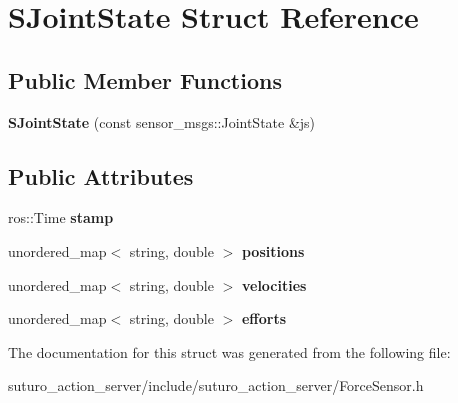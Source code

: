 \hypertarget{structSJointState}{\section{S\-Joint\-State Struct Reference}
\label{structSJointState}
}
\subsection*{Public Member Functions}
\begin{DoxyCompactItemize}
\item 
\hypertarget{structSJointState_a8f07fd4b8cb528fd52ab266fd4420513}{{\bfseries S\-Joint\-State} (const sensor\-\_\-msgs\-::\-Joint\-State \&js)}\label{structSJointState_a8f07fd4b8cb528fd52ab266fd4420513}

\end{DoxyCompactItemize}
\subsection*{Public Attributes}
\begin{DoxyCompactItemize}
\item 
\hypertarget{structSJointState_a0bd061234683d61e344f7d30fd6347bc}{ros\-::\-Time {\bfseries stamp}}\label{structSJointState_a0bd061234683d61e344f7d30fd6347bc}

\item 
\hypertarget{structSJointState_add95046af13888b7f3b91eef52d2a4bd}{unordered\-\_\-map$<$ string, double $>$ {\bfseries positions}}\label{structSJointState_add95046af13888b7f3b91eef52d2a4bd}

\item 
\hypertarget{structSJointState_a22ca01f858804b1ea16d6e4043f623a0}{unordered\-\_\-map$<$ string, double $>$ {\bfseries velocities}}\label{structSJointState_a22ca01f858804b1ea16d6e4043f623a0}

\item 
\hypertarget{structSJointState_a9c9f8c893373e180ab88b3a1465ffd72}{unordered\-\_\-map$<$ string, double $>$ {\bfseries efforts}}\label{structSJointState_a9c9f8c893373e180ab88b3a1465ffd72}

\end{DoxyCompactItemize}


The documentation for this struct was generated from the following file\-:\begin{DoxyCompactItemize}
\item 
suturo\-\_\-action\-\_\-server/include/suturo\-\_\-action\-\_\-server/Force\-Sensor.\-h\end{DoxyCompactItemize}
